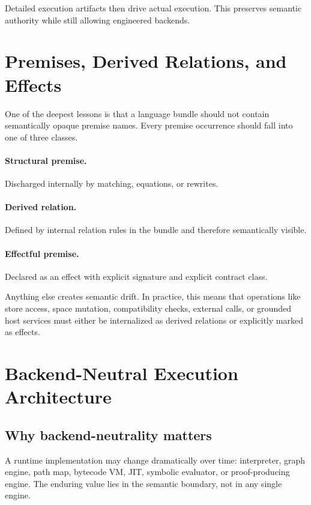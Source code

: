 \documentclass[11pt]{article}
\begin{document}
Detailed execution artifacts then drive actual execution. This preserves semantic authority while still allowing engineered backends.

\section{Premises, Derived Relations, and Effects}

One of the deepest lessons is that a language bundle should not contain semantically opaque premise names. Every premise occurrence should fall into one of three classes.

\paragraph{Structural premise.}
Discharged internally by matching, equations, or rewrites.

\paragraph{Derived relation.}
Defined by internal relation rules in the bundle and therefore semantically visible.

\paragraph{Effectful premise.}
Declared as an effect with explicit signature and explicit contract class.

Anything else creates semantic drift. In practice, this means that operations like store access, space mutation, compatibility checks, external calls, or grounded host services must either be internalized as derived relations or explicitly marked as effects.

\section{Backend-Neutral Execution Architecture}

\subsection{Why backend-neutrality matters}

A runtime implementation may change dramatically over time: interpreter, graph engine, path map, bytecode VM, JIT, symbolic evaluator, or proof-producing engine. The enduring value lies in the semantic boundary, not in any single engine.
\end{document}
